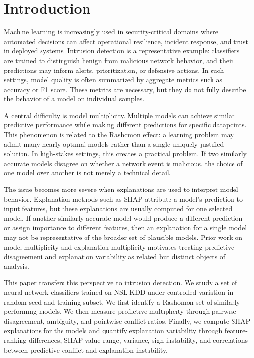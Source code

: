 \section{Introduction}

Machine learning is increasingly used in security-critical domains where automated decisions can affect operational resilience, incident response, and trust in deployed systems. Intrusion detection is a representative example: classifiers are trained to distinguish benign from malicious network behavior, and their predictions may inform alerts, prioritization, or defensive actions. In such settings, model quality is often summarized by aggregate metrics such as accuracy or F1 score. These metrics are necessary, but they do not fully describe the behavior of a model on individual samples.

A central difficulty is model multiplicity. Multiple models can achieve similar predictive performance while making different predictions for specific datapoints. This phenomenon is related to the Rashomon effect: a learning problem may admit many nearly optimal models rather than a single uniquely justified solution. In high-stakes settings, this creates a practical problem. If two similarly accurate models disagree on whether a network event is malicious, the choice of one model over another is not merely a technical detail.

The issue becomes more severe when explanations are used to interpret model behavior. Explanation methods such as SHAP attribute a model's prediction to input features, but these explanations are usually computed for one selected model. If another similarly accurate model would produce a different prediction or assign importance to different features, then an explanation for a single model may not be representative of the broader set of plausible models. Prior work on model multiplicity and explanation multiplicity motivates treating predictive disagreement and explanation variability as related but distinct objects of analysis.

This paper transfers this perspective to intrusion detection. We study a set of neural network classifiers trained on NSL-KDD under controlled variation in random seed and training subset. We first identify a Rashomon set of similarly performing models. We then measure predictive multiplicity through pairwise disagreement, ambiguity, and pointwise conflict ratios. Finally, we compute SHAP explanations for the models and quantify explanation variability through feature-ranking differences, SHAP value range, variance, sign instability, and correlations between predictive conflict and explanation instability.

